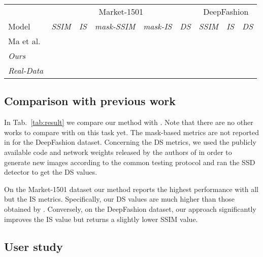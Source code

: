 \documentclass[10pt,twocolumn,letterpaper]{article}
\begin{document}
\begin{table*}[h!]
\caption{Comparison with the state of the art.  These values have been computed 
using the code and the network weights released by Ma et al. \cite{ma2017pose} in order to generate new images.}
\centering
\begin{tabular}{l|ccccc|ccc}
  \hline
  &\multicolumn{5}{c|}{Market-1501}&\multicolumn{3}{c}{DeepFashion}\\
 Model &\emph{SSIM} & \emph{IS}&\emph{mask-SSIM} & \emph{mask-IS} &\emph{DS}& \emph{SSIM} & \emph{IS} &\emph{DS}\\
\hline
Ma et al. \cite{ma2017pose} &\bf &  &  & &   & &  &   \\
\emph{Ours}& &  &  & &  & &  &  \\
\hline
\emph{Real-Data}& &  &  & &  & &  &  \\
\hline
\end{tabular}
\label{tab:result}
\end{table*}

\subsection{Comparison with previous work}
\label{Comparison}

In Tab.~\ref{tab:result} we compare our method with \cite{ma2017pose}. Note that there are no other works to compare with on this task yet. 
The mask-based metrics are not reported in \cite{ma2017pose} for the DeepFashion dataset.
Concerning the DS metrics,
we used the publicly available code and  network weights released by the authors of \cite{ma2017pose} in order to
generate new images according to the common testing protocol  and  ran the SSD detector to get the DS values.

On the Market-1501 dataset our method
 reports the highest performance with all but the IS metrics. Specifically, our  DS values are much higher than those obtained by \cite{ma2017pose}.
Conversely, on the DeepFashion dataset, our approach significantly improves the IS value but returns a slightly lower SSIM value. 

\subsection{User study}
\label{Userstudy}
\end{document}
